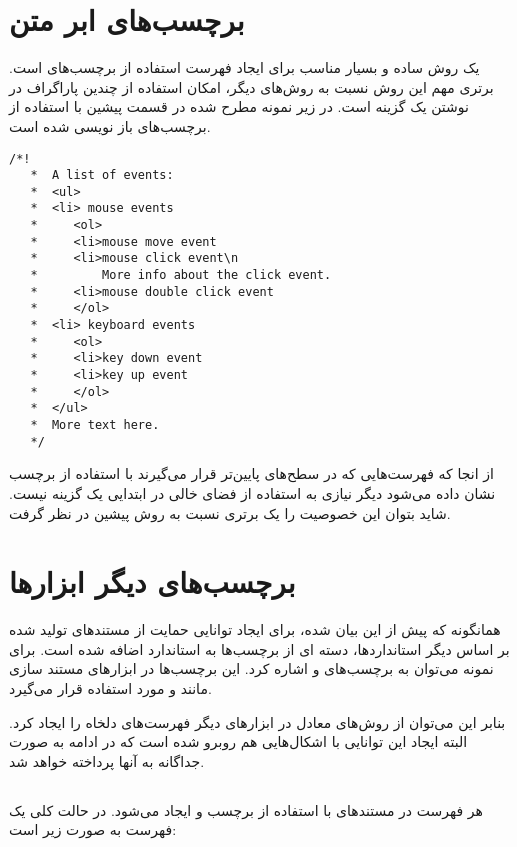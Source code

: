 \section{برچسب‌های ابر متن}

یک روش ساده و بسیار مناسب برای ایجاد فهرست استفاده از برچسب‌های  است. 
برتری مهم این روش نسبت به روش‌های دیگر، امکان استفاده از چندین پاراگراف در نوشتن
یک گزینه است.  در زیر نمونه مطرح شده در قسمت پیشین با استفاده از برچسب‌های
 باز نویسی شده است.

\begin{latin}
\lstset{language=C++}  
\begin{lstlisting}[frame=single] 
  /*! 
   *  A list of events:
   *  <ul>
   *  <li> mouse events
   *     <ol>
   *     <li>mouse move event
   *     <li>mouse click event\n
   *         More info about the click event.
   *     <li>mouse double click event
   *     </ol>
   *  <li> keyboard events
   *     <ol>     
   *     <li>key down event
   *     <li>key up event
   *     </ol>
   *  </ul>
   *  More text here.
   */
\end{lstlisting}
\end{latin}

از انجا که فهرست‌هایی که در سطح‌های پایین‌تر قرار می‌گیرند با استفاده از برچسب
نشان داده می‌شود دیگر نیازی به استفاده از فضای خالی در ابتدایی یک گزینه نیست.
شاید بتوان این خصوصیت را یک برتری نسبت به روش پیشین در نظر گرفت.

\section{برچسب‌های دیگر ابزارها}

همانگونه که پیش از این بیان شده، برای ایجاد توانایی حمایت از مستندهای تولید شده
بر اساس دیگر استانداردها، دسته ای از برچسب‌ها به استاندارد  اضافه
شده است. برای نمونه می‌توان به برچسب‌های  و  اشاره کرد. این
برچسب‌ها در ابزارهای مستند سازی مانند  و  مورد استفاده قرار
می‌گیرد.

بنابر این می‌توان از روش‌های معادل در ابزارهای دیگر فهرست‌های دلخاه را ایجاد
کرد. البته ایجاد این توانایی با اشکال‌هایی هم روبرو شده است که در ادامه به صورت
جداگانه به آنها پرداخته خواهد شد.

\subsection{}

هر فهرست در مستندهای  با استفاده از برچسب  و 
ایجاد می‌شود. در حالت کلی یک فهرست به صورت زیر است:

